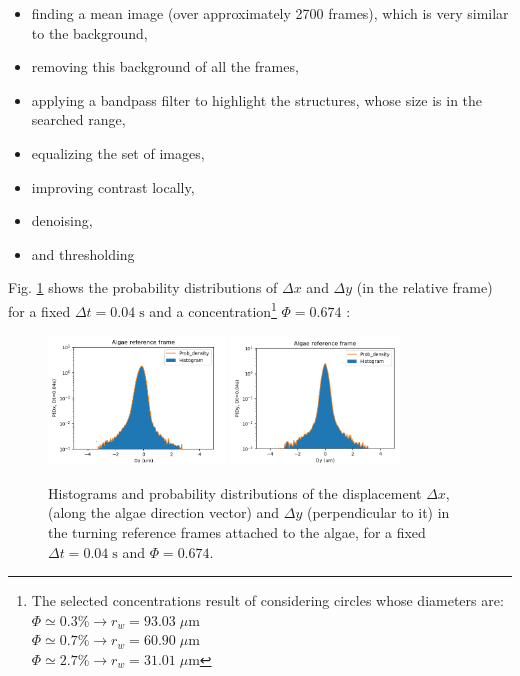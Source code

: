 \begin{itemize}
	\item finding a mean image (over approximately 2700 frames), which is very similar to the background,
	\item removing this background of all the frames,
	\item applying a bandpass filter to highlight the structures, whose size is in the searched range,
	\item equalizing the set of images,
	\item improving contrast locally,
	\item denoising,
	\item and thresholding
\end{itemize}

Fig. \ref{prob_dist_e3} shows the probability distributions of $\Delta x$ and $\Delta y$ (in the relative frame) for a fixed $\Delta t = 0.04 \; \textrm{s}$ and a concentration\footnote{The selected concentrations result of considering circles whose diameters are: \\ 
	$ \Phi \simeq 0.3\% \rightarrow r_w = 93.03 \; \mu \textrm{m} $ \\
	$ \Phi \simeq 0.7\% \rightarrow r_w = 60.90 \; \mu \textrm{m} $ \\
	$ \Phi \simeq 2.7\% \rightarrow r_w = 31.01 \; \mu \textrm{m} $} 
$\Phi = 0.674$ :

\begin{figure}[H]
	\centering
	\includegraphics[width=0.42\textwidth]{archivos/pdf_x_e3.png}
	\includegraphics[width=0.4\textwidth]{archivos/pdf_y_e3.png}
	\caption{Histograms and probability distributions of the displacement $\Delta x$, (along the algae direction vector) and $\Delta y$ (perpendicular to it) in the turning reference frames attached to the algae, for a fixed $\Delta t = 0.04 \; \textrm{s}$ and $\Phi = 0.674$.}
	\label{prob_dist_e3}
\end{figure}

